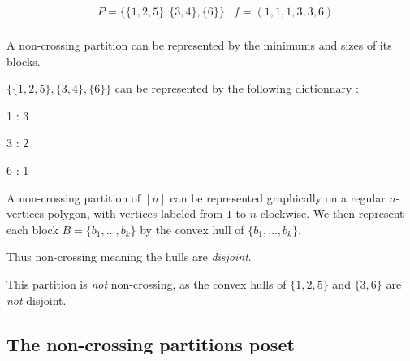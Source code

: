 \begin{example}[$n = 6$]
    \begin{align*}
        &P = \{\{1, 2, 5\}, \{3, 4\}, \{6\}\}
        &f = (1, 1, 1, 3, 3, 6)\\
    \end{align*}
\end{example}

\begin{cor}
    A non-crossing partition can be represented by the minimums
    and sizes of its blocks.
\end{cor}

\begin{example}
    $\{\{1, 2, 5\}, \{3, 4\}, \{6\}\}$ can be represented by
    the following dictionnary :\\
    \begin{itemize*}
        \item 1 : 3\\
        \item 3 : 2\\
        \item 6 : 1\\
    \end{itemize*}
\end{example}

A non-crossing partition of $[n]$ can be represented graphically
on a regular $n$-vertices polygon, with vertices labeled from $1$
to $n$ clockwise. We then represent each block $B = \{b_1, \ldots, b_k\}$
by the convex hull of $\{b_1, \ldots, b_k\}$.\\

\begin{example}[$P = \{\{1, 2, 5\}, \{3, 4\}, \{6\}\}$]
    
    Thus non-crossing meaning the hulls are
    \emph{disjoint}.\\
\end{example}

\begin{example}[Counter-example : $P = \{\{1, 5, 2\},
    \{3, 6\}, \{4\}\}$]
    
    This partition is \emph{not} non-crossing, as the
    convex hulls of $\{1, 2, 5\}$ and $\{3, 6\}$ are
    \emph{not} disjoint.
\end{example}

\subsection{The non-crossing partitions poset}

